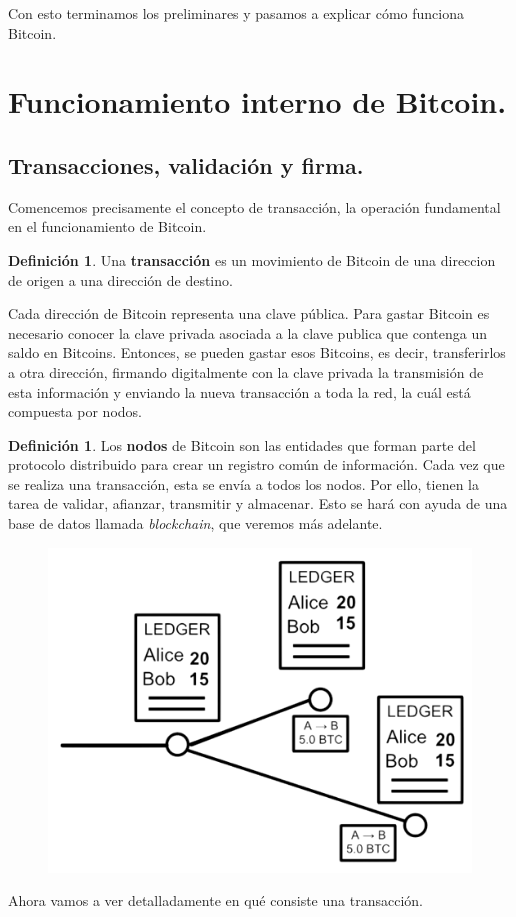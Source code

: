 \documentclass[twoside]{article}
\theoremstyle{definition}
\newtheorem{defi}[teorema]{Definición}
\begin{document}
Con esto terminamos los preliminares y pasamos a explicar cómo funciona Bitcoin.
\newpage
\section{Funcionamiento interno de Bitcoin.}
\subsection{Transacciones, validación y firma.}
Comencemos precisamente el concepto de transacción, la operación fundamental en el funcionamiento de Bitcoin. 
\begin{defi} Una \textbf{transacción} es un movimiento de Bitcoin de una direccion de origen a una dirección de destino. 
\end{defi}
Cada dirección de Bitcoin representa una clave pública. Para gastar Bitcoin es necesario conocer la clave privada asociada a la clave publica que contenga un saldo en Bitcoins. Entonces, se pueden gastar esos Bitcoins, es decir, transferirlos a otra dirección, firmando digitalmente con la clave privada la transmisión de esta información y enviando la nueva transacción a toda la red, la cuál está compuesta por nodos.
\begin{defi}
Los \textbf{nodos} de Bitcoin son las entidades que forman parte del protocolo distribuido para crear un registro común de información. Cada vez que se realiza una transacción, esta se envía a todos los nodos. Por ello, tienen la tarea de validar, afianzar, transmitir y almacenar. Esto se hará con ayuda de una base de datos llamada \emph{blockchain}, que veremos más adelante.
\end{defi}
\begin{figure}[h!]
\includegraphics[scale=0.45]{transaction}
\end{figure}
Ahora vamos a ver detalladamente en qué consiste una transacción. 
\end{document}
